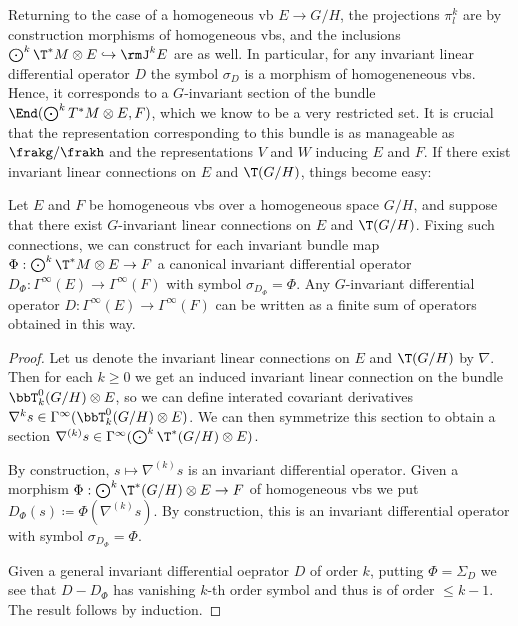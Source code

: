 Returning to the case of a homogeneous \gls{vb} $E\to G\slash H$, the projections $\pi^k_l$ are by construction morphisms of homogeneous \glspl{vb}, and the inclusions $\bigodot\nolimits^k\T^\ast M\otimes E\hookrightarrow \rmJ^k E$ are as well. In particular, for any invariant linear differential operator $D$ the symbol $\sigma_D$ is a morphism of homogeneneous \glspl{vb}. Hence, it corresponds to a $G$-invariant section of the bundle $\End(\bigodot\nolimits^k T^\ast M\otimes E,F)$, which we know to be a very restricted set. It is crucial that the representation corresponding to this bundle is as manageable as $\frakg\slash\frakh$ and the representations $V$ and $W$ inducing $E$ and $F$. If there exist invariant linear connections on $E$ and $\T (G\slash H)$, things become easy:

\begin{prop}\label{prop 1.4.9 Cap}
    Let $E$ and $F$ be homogeneous \glspl{vb} over a homogeneous space $G\slash H$, and suppose that there exist $G$-invariant linear connections on $E$ and $\T(G\slash H)$. Fixing such connections, we can construct for each invariant bundle map $\Phi:\bigodot\nolimits^k\T^\ast M\otimes E\to F$ a canonical invariant differential operator $D_\Phi:\Gamma^\infty(E)\to \Gamma^\infty(F)$ with symbol $\sigma_{D_{\Phi}}=\Phi$. Any $G$-invariant differential operator $D:\Gamma^\infty(E)\to \Gamma^\infty(F)$ can be written as a finite sum of operators obtained in this way.
\end{prop}
\begin{proof}
    Let us denote the invariant linear connections on $E$ and $\T (G\slash H)$ by $\nabla$. Then for each $k\geq 0$ we get an induced invariant linear connection on the bundle $\bbT^0_k(G\slash H)\otimes E$, so we can define interated covariant derivatives $\nabla^k s\in\Gamma^\infty(\bbT^0_k (G\slash H)\otimes E)$. We can then symmetrize this section to obtain a section $\nabla^{(k)}s\in \Gamma^\infty(\bigodot\nolimits^k \T^\ast (G\slash H)\otimes E)$.

    By construction, $s\mapsto \nabla^{(k)}s$ is an invariant differential operator. Given a morphism $\Phi:\bigodot\nolimits^k\T^\ast (G\slash H)\otimes E\to F$ of homogeneous \glspl{vb} we put $D_\Phi(s)\coloneqq \Phi(\nabla^{(k)}s)$. By construction, this is an invariant differential operator with symbol $\sigma_{D_\Phi}=\Phi$.

    Given a general invariant differential oeprator $D$ of order $k$, putting $\Phi=\varSigma_D$ we see that $D-D_\Phi$ has vanishing $k$-th order symbol and thus is of order $\leq k-1$. The result follows by induction.
\end{proof}


